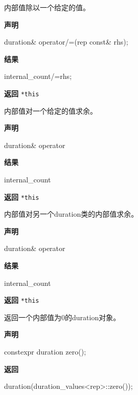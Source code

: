 
内部值除以一个给定的值。

\textbf{声明}

\begin{cpp}
duration& operator/=(rep const& rhs);
\end{cpp}

\textbf{结果}

\begin{cpp}
internal_count/=rhs;
\end{cpp}

\textbf{返回}
\texttt{*this}


内部值对一个给定的值求余。

\textbf{声明}

\begin{cpp}
duration& operator%
\end{cpp}

\textbf{结果}

\begin{cpp}
internal_count%
\end{cpp}

\textbf{返回}
\texttt{*this}


内部值对另一个duration类的内部值求余。

\textbf{声明}

\begin{cpp}
duration& operator%
\end{cpp}

\textbf{结果}

\begin{cpp}
internal_count%
\end{cpp}

\textbf{返回}
\texttt{*this}


返回一个内部值为0的duration对象。

\textbf{声明}

\begin{cpp}
constexpr duration zero();
\end{cpp}

\textbf{返回}

\begin{cpp}
duration(duration_values<rep>::zero());
\end{cpp}

